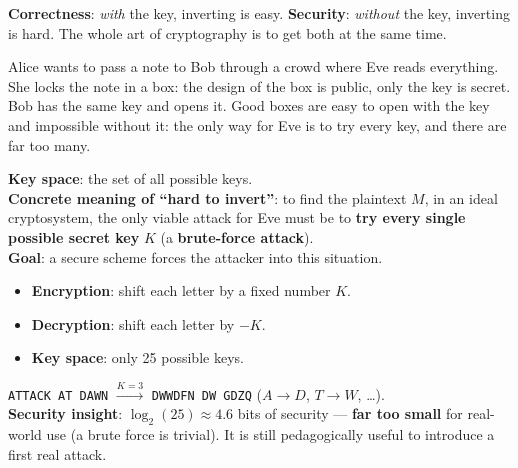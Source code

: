 \begin{rembox}[title=Two requirements that pull in opposite directions]
\textbf{Correctness}: \emph{with} the key, inverting is easy. \textbf{Security}:
\emph{without} the key, inverting is hard. The whole art of cryptography is to get both
at the same time.
\end{rembox}

\begin{goatbox}
Alice wants to pass a note to Bob through a crowd where Eve reads everything. She locks the note
in a box: the design of the box is public, only the key is secret. Bob has the same key and opens
it. Good boxes are easy to open with the key and impossible without it: the only way for Eve is
to try every key, and there are far too many.
\end{goatbox}

\begin{defnbox}[title=Hard to invert: the key space and brute force]
\textbf{Key space}: the set of all possible keys. \\
\textbf{Concrete meaning of ``hard to invert''}: to find the plaintext $M$, in an ideal
cryptosystem, the only viable attack for Eve must be to \textbf{try every single possible
secret key} $K$ (a \textbf{brute-force attack}). \\
\textbf{Goal}: a secure scheme forces the attacker into this situation.
\end{defnbox}

\begin{defnbox}[title=Caesar's cipher]
\begin{itemize}
  \item \textbf{Encryption}: shift each letter by a fixed number $K$.
  \item \textbf{Decryption}: shift each letter by $-K$.
  \item \textbf{Key space}: only 25 possible keys.
\end{itemize}
\end{defnbox}

\begin{exbox}[title={Caesar with $K = 3$}]
\texttt{ATTACK AT DAWN} $\xrightarrow{K=3}$ \texttt{DWWDFN DW GDZQ}
($A \to D$, $T \to W$, \ldots). \\
\textbf{Security insight}: $\log_2(25) \approx 4.6$ bits of security --- \textbf{far too
small} for real-world use (a brute force is trivial). It is still pedagogically useful to
introduce a first real attack.
\end{exbox}

